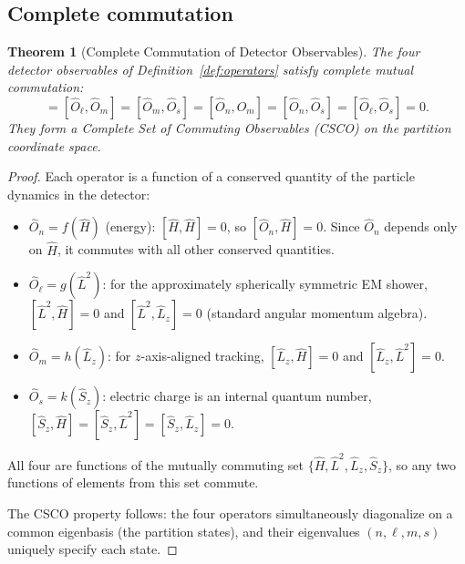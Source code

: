 \documentclass[twocolumn,10pt,a4paper]{article}
\theoremstyle{thmstyle}
\newtheorem{theorem}{Theorem}[section]
\theoremstyle{definition}
\theoremstyle{remark}
\begin{document}
\subsection{Complete commutation}

\begin{theorem}[Complete Commutation of Detector Observables]
\label{thm:commutation}
The four detector observables of Definition~\ref{def:operators} satisfy
complete mutual commutation:
\begin{equation}
[\hat{O}_n, \hat{O}_\ell] = [\hat{O}_\ell, \hat{O}_m]
= [\hat{O}_m, \hat{O}_s] = [\hat{O}_n, \hat{O}_m]
= [\hat{O}_n, \hat{O}_s] = [\hat{O}_\ell, \hat{O}_s] = 0.
\label{eq:commutation}
\end{equation}
They form a Complete Set of Commuting Observables (CSCO) on the partition
coordinate space.
\end{theorem}

\begin{proof}
Each operator is a function of a conserved quantity of the particle
dynamics in the detector:
\begin{itemize}[nosep]
\item $\hat{O}_n = f(\hat{H})$ (energy): $[\hat{H}, \hat{H}] = 0$, so
$[\hat{O}_n, \hat{H}] = 0$. Since $\hat{O}_n$ depends only on $\hat{H}$,
it commutes with all other conserved quantities.
\item $\hat{O}_\ell = g(\hat{L}^2)$: for the approximately spherically
symmetric EM shower, $[\hat{L}^2, \hat{H}] = 0$ and
$[\hat{L}^2, \hat{L}_z] = 0$ (standard angular momentum algebra).
\item $\hat{O}_m = h(\hat{L}_z)$: for $z$-axis-aligned tracking,
$[\hat{L}_z, \hat{H}] = 0$ and $[\hat{L}_z, \hat{L}^2] = 0$.
\item $\hat{O}_s = k(\hat{S}_z)$: electric charge is an internal quantum
number, $[\hat{S}_z, \hat{H}] = [\hat{S}_z, \hat{L}^2]
= [\hat{S}_z, \hat{L}_z] = 0$.
\end{itemize}
All four are functions of the mutually commuting set
$\{\hat{H}, \hat{L}^2, \hat{L}_z, \hat{S}_z\}$,
so any two functions of elements from this set commute.

The CSCO property follows: the four operators simultaneously diagonalize
on a common eigenbasis (the partition states), and their eigenvalues
$(n, \ell, m, s)$ uniquely specify each state.
\end{proof}
\end{document}
